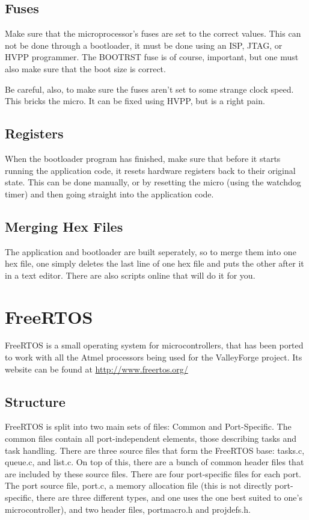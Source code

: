 \documentclass[a4paper, oneside, 11pt, titlepage, onecolumn, openright]{report}
\begin{document}
{\section{Fuses}
			\label{s:BootloaderFuses}
			Make sure that the microprocessor's fuses are set to the correct values. This can not be done through a bootloader, it must be done using an ISP, JTAG, or HVPP programmer. The BOOTRST fuse is of course, important, but one must also make sure that the boot size is correct.
			
			Be careful, also, to make sure the fuses aren't set to some strange clock speed. This bricks the micro. It can be fixed using HVPP, but is a right pain.
						
\section{Registers}
			\label{s:BootloaderRegisters}
			When the bootloader program has finished, make sure that before it starts running the application code, it resets hardware registers back to their original state. This can be done manually, or by resetting the micro (using the watchdog timer) and then going straight into the application code.
			
			
\section{Merging Hex Files}
			\label{s:BootloaderMergingHexFiles}
			The application and bootloader are built seperately, so to merge them into one hex file, one simply deletes the last line of one hex file and puts the other after it in a text editor.
			There are also scripts online that will do it for you.
			
\chapter{FreeRTOS}
			\label{C:FreeRTOS}
			FreeRTOS is a small operating system for microcontrollers, that has been ported to work with all the Atmel processors being used for the ValleyForge project. Its website can be found at \url{http://www.freertos.org/}
			
\section{Structure}
			\label{s:FreeRTOSStructure}
			FreeRTOS is split into two main sets of files: Common and Port-Specific. The common files contain all port-independent elements, those describing tasks and task handling.\newline
			There are three source files that form the FreeRTOS base: tasks.c, queue.c, and list.c. On top of this, there are a bunch of common header files that are included by these source files.\newline
			There are four port-specific files for each port. The port source file, port.c, a memory allocation file (this is not directly port-specific, there are three different types, and one uses the one best suited to one's microcontroller), and two header files, portmacro.h and projdefs.h. 			
						
}
\end{document}
